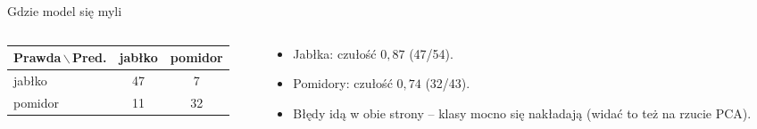 \documentclass[aspectratio=1610, polish]{beamer}
\begin{document}
\begin{frame}{Gdzie model się myli}
    \begin{columns}[T]
        \begin{column}{0.48\textwidth}
            \centering
            \begin{table}\small
            \begin{tabular}{lcc}
                \toprule
                Prawda\,$\backslash$\,Pred. & jabłko & pomidor \\
                \midrule
                jabłko  & 47 & 7 \\
                pomidor & 11 & 32 \\
                \bottomrule
            \end{tabular}
            \end{table}
        \end{column}
        \begin{column}{0.5\textwidth}
            \begin{itemize}
                \item Jabłka: czułość $0{,}87$ (47/54).
                \item Pomidory: czułość $0{,}74$ (32/43).
                \item Błędy idą w obie strony -- klasy mocno się nakładają (widać
                      to też na rzucie PCA).
            \end{itemize}
        \end{column}
    \end{columns}
\end{frame}
\end{document}
